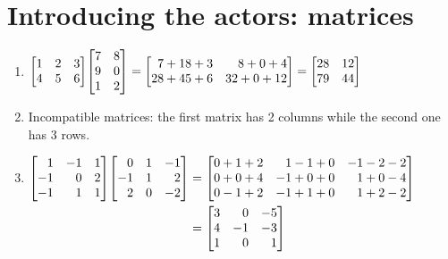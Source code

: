 \section*{Introducing the actors: matrices}

\newenvironment{xmatrix}{\begin{bmatrix*}[r]}{\end{bmatrix*}}

\begin{exercise}{2}
  \begin{enumerate}
    \item $\begin{xmatrix}1 & 2 & 3 \\ 4 & 5 & 6\end{xmatrix}
           \begin{xmatrix}7 & 8 \\ 9 & 0 \\ 1 & 2\end{xmatrix} =
           \begin{xmatrix}
              7 + 18 + 3 &  8 + 0 +  4 \\
             28 + 45 + 6 & 32 + 0 + 12
           \end{xmatrix} =
           \begin{xmatrix}28 & 12 \\ 79 & 44\end{xmatrix}$

    \item Incompatible matrices: the first matrix has 2 columns while the second
          one has 3 rows.

    \item $\begin{aligned}[t]
            \begin{xmatrix}
               1 & -1 &  1 \\
              -1 &  0 &  2 \\
              -1 &  1 &  1
            \end{xmatrix}
            \begin{xmatrix}
               0 &  1 & -1 \\
              -1 &  1 &  2 \\
               2 &  0 & -2
            \end{xmatrix} &=
            \begin{xmatrix}
              0 + 1 + 2 &  1 - 1 + 0 & -1 - 2 - 2 \\
              0 + 0 + 4 & -1 + 0 + 0 &  1 + 0 - 4 \\
              0 - 1 + 2 & -1 + 1 + 0 &  1 + 2 - 2
            \end{xmatrix} \\ &=
            \begin{xmatrix}
              3 &  0 & -5 \\
              4 & -1 & -3 \\
              1 &  0 &  1
            \end{xmatrix}
          \end{aligned}$


\end{enumerate}
\end{exercise}
